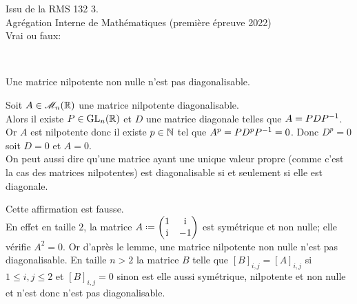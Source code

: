 \begin{exercice}
    Issu de la RMS 132 3. \\
    Agrégation Interne de Mathématiques (première épreuve 2022) \\
    Vrai ou faux: 
\end{exercice}

\begin{solution}\\

    \begin{lemme} 
        Une matrice nilpotente non nulle n'est pas diagonalisable.
    \end{lemme}
    
    \begin{preuve}
        Soit $A \in \mathscr{M}_n(\mathbb{R})$ une matrice nilpotente diagonalisable. \\
        Alors il existe $P \in \mathrm{GL}_n(\mathbb{R})$ et $D$ une matrice diagonale telles que $A = PDP^{-1}$. Or $A$ est nilpotente donc il existe $p \in \mathbb{N}$ tel que $A^p = P D^p P^{-1} = 0$. Donc $D^p = 0$ soit $D = 0$ et $A = 0$. \\
        On peut aussi dire qu'une matrice ayant une unique valeur propre (comme c'est la cas des matrices nilpotentes) est diagonalisable si et seulement si elle est diagonale.
    \end{preuve}
    Cette affirmation est fausse. \\
    En effet en taille $2$, la matrice $A \defeq \begin{pmatrix}
        1 & \mi \\
        \mi & -1
    \end{pmatrix}$ est symétrique et non nulle; elle vérifie $A^2 = 0$. Or d'après le lemme, une matrice nilpotente non nulle n'est pas diagonalisable. En taille $n > 2$ la matrice $B$ telle que $[B]_{i,j} = [A]_{i,j}$ si $1 \leqslant i, j \leqslant 2$ et $[B]_{i,j} = 0$ sinon est elle aussi symétrique, nilpotente et non nulle et n'est donc n'est pas diagonalisable. 
\end{solution}   

